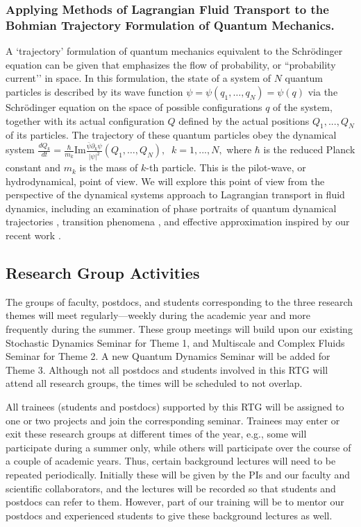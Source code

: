 \documentclass[11pt]{NSFamsart}
\begin{document}
\subsubsection*{Applying Methods of Lagrangian Fluid Transport to the Bohmian Trajectory Formulation of Quantum Mechanics.}   A `trajectory'  formulation of quantum mechanics  equivalent to the Schr\"{o}dinger equation can be given \cite{Bohmian, Holland1993TheQT} that emphasizes the flow of probability, or ``probability current’’ in space. 
In this formulation, the state of a system of $N$ quantum particles is described by its wave function $\psi=\psi(q_1,…,q_N)=\psi(q)$ via the Schr\"{o}dinger equation  on the space of possible configurations $q$ of the system, together with its actual configuration $Q$ defined by the actual positions $Q_1,...,Q_N$ of its particles. The trajectory of these quantum particles obey the dynamical system
$
\frac{dQ_k}{dt}= \frac{\hbar}{m_k} \text{Im} \frac{\bar\psi  \partial_k \psi}{|\psi|^2}(Q_1,…,Q_N),\;\; k=1, ..., N,  
$
where $\hbar$ is the reduced Planck constant and $m_k$ is the mass of $k$-th particle.
This is the pilot-wave, or hydrodynamical, point of view. We will explore this point of view from the perspective of the dynamical systems approach to Lagrangian transport in fluid dynamics, including an examination of phase portraits of quantum dynamical trajectories \cite{Berndl1995OnTG}, transition phenomena \cite{waalkens2007wigner,Micha2006QuantumDW, Dittrich2016}, and effective approximation inspired by our recent work \cite{Li2021BohmianTO}. 




\subsection{Research Group Activities}
The groups of faculty, postdocs, and students corresponding to the three research themes will meet regularly---weekly during the academic year and more frequently during the summer.  These group meetings will build upon our existing Stochastic Dynamics Seminar for Theme 1, and Multiscale and Complex Fluids Seminar for Theme 2. A new Quantum Dynamics Seminar will be added for Theme 3.  Although not all postdocs and students involved in this RTG will attend all research groups, the times will be scheduled to not overlap. 

All trainees (students and postdocs) supported by this RTG will be assigned to one or two projects and join the corresponding seminar.  Trainees may enter or exit these research groups at different times of the year, e.g., some will participate during a summer only, while others will participate over the course of a couple of academic years. Thus, certain background lectures will need to be repeated periodically.  Initially these will be given by the PIs and our faculty and scientific collaborators, and the lectures will be recorded so that students and postdocs can refer to them.  However, part of our training will be to mentor our postdocs and experienced students to give these background lectures as well.  
\end{document}
